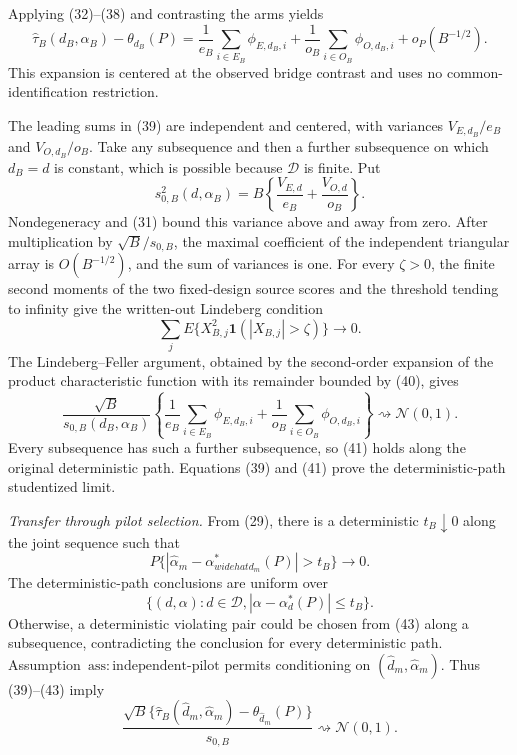 Applying (32)--(38) and contrasting the arms yields
\[
 \widehat\tau_B(d_B,\alpha_B)-\theta_{d_B}(P)
 =\frac1{e_B}\sum_{i\in E_B}\phi_{E,d_B,i}
 +\frac1{o_B}\sum_{i\in O_B}\phi_{O,d_B,i}
 +o_P(B^{-1/2}).                                               \tag{39}
\]
This expansion is centered at the observed bridge contrast and uses no common-identification restriction.

The leading sums in (39) are independent and centered, with variances \(V_{E,d_B}/e_B\) and \(V_{O,d_B}/o_B\).  Take any subsequence and then a further subsequence on which \(d_B=d\) is constant, which is possible because \(\mathcal D\) is finite.  Put
\[
 s_{0,B}^2(d,\alpha_B)
 =B\left\{\frac{V_{E,d}}{e_B}+\frac{V_{O,d}}{o_B}\right\}.
\]
Nondegeneracy and (31) bound this variance above and away from zero.  After multiplication by \(\sqrt B/s_{0,B}\), the maximal coefficient of the independent triangular array is \(O(B^{-1/2})\), and the sum of variances is one.  For every \(\zeta>0\), the finite second moments of the two fixed-design source scores and the threshold tending to infinity give the written-out Lindeberg condition
\[
 \sum_j E\{X_{B,j}^2\mathbf1(|X_{B,j}|>\zeta)\}\longrightarrow0. \tag{40}
\]
The Lindeberg--Feller argument, obtained by the second-order expansion of the product characteristic function with its remainder bounded by (40), gives
\[
 \frac{\sqrt B}{s_{0,B}(d_B,\alpha_B)}
 \left\{
 \frac1{e_B}\sum_{i\in E_B}\phi_{E,d_B,i}
 +\frac1{o_B}\sum_{i\in O_B}\phi_{O,d_B,i}
 \right\}\rightsquigarrow\mathcal N(0,1).                  \tag{41}
\]
Every subsequence has such a further subsequence, so (41) holds along the original deterministic path.  Equations (39) and (41) prove the deterministic-path studentized limit.

\emph{Transfer through pilot selection.}  From (29), there is a deterministic \(t_B\downarrow0\) along the joint sequence such that
\[
 P\{|\widehat\alpha_m-\alpha_{widehat d_m}^*(P)|>t_B\}\longrightarrow0. \tag{42}
\]
The deterministic-path conclusions are uniform over
\[
 \{(d,\alpha):d\in\mathcal D,
 |\alpha-\alpha_d^*(P)|\le t_B\}.                            \tag{43}
\]
Otherwise, a deterministic violating pair could be chosen from (43) along a subsequence, contradicting the conclusion for every deterministic path.  Assumption~\(\mathrm{ass{:}independent\text{-}pilot}\) permits conditioning on \((\widehat d_m,\widehat\alpha_m)\).  Thus (39)--(43) imply
\[
 \frac{\sqrt B\{\widehat\tau_B(\widehat d_m,\widehat\alpha_m)
 -\theta_{\widehat d_m}(P)\}}{s_{0,B}}
 \rightsquigarrow\mathcal N(0,1).                            \tag{44}
\]

